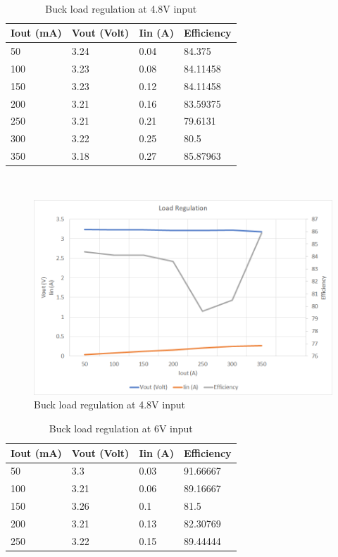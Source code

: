 \\
\begin{table}[H]
\centering
\begin{tabular}{|l|l|l|l|}
\hline
Iout (mA) & Vout (Volt) & Iin (A) & Efficiency \\ \hline
50        & 3.24        & 0.04    & 84.375     \\ \hline
100       & 3.23        & 0.08    & 84.11458   \\ \hline
150       & 3.23        & 0.12    & 84.11458   \\ \hline
200       & 3.21        & 0.16    & 83.59375   \\ \hline
250       & 3.21        & 0.21    & 79.6131    \\ \hline
300       & 3.22        & 0.25    & 80.5       \\ \hline
350       & 3.18        & 0.27    & 85.87963   \\ \hline
\end{tabular}
\caption{Buck load regulation at 4.8V input}
\label{table:4}
\end{table}
\\
\begin{figure}[H]
	\centering
	\includegraphics[width=\columnwidth]{IMGS/Buck load regulation at 4.8V input.png}
	\caption{Buck load regulation at 4.8V input}
	\label{fig:arch}
\end{figure}
\begin{table}[H]
\centering
\begin{tabular}{|l|l|l|l|}
\hline
Iout (mA) & Vout (Volt) & Iin (A) & Efficiency \\ \hline
50        & 3.3         & 0.03    & 91.66667   \\ \hline
100       & 3.21        & 0.06    & 89.16667   \\ \hline
150       & 3.26        & 0.1     & 81.5       \\ \hline
200       & 3.21        & 0.13    & 82.30769   \\ \hline
250       & 3.22        & 0.15    & 89.44444   \\ \hline
\end{tabular}
\caption{Buck load regulation at 6V input}
\label{table:4}
\end{table}
